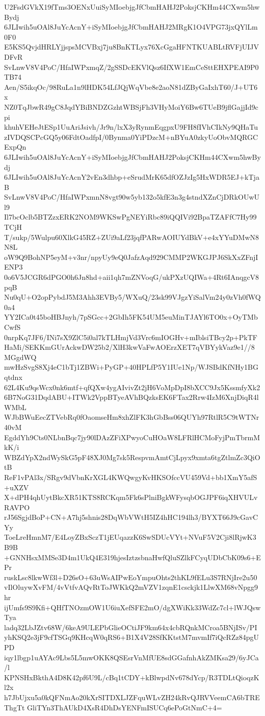 U2FsdGVkX19fTms3OENxUuiSyMIoebjgJfCbmHAHJ2PoksjCKHm44CXwm5hwBydj
6JLIwih5uOAl8JuYcAcnY+iSyMIoebjgJfCbmHAHJ2MRgK1O4VPG73jxQYlLm0F0
E5KS5QvjdHRLYjjspsMCVBxj7ju8BnKTLyx76XcGgaHFNTKUABLtRVFjUIJVDFvR
SvLnwV8V4PoC/HfaIWPxmqZ/2gSSDcEKVlQsz6IfXW1EmCeSttEHXPEAI9P0TB74
Aen/S5ikqOc/98RuLa1n9lHDK54LfJQjWqVbe8e2aoN81dZByGaIxhT60/J+UT6x
NZ0TqJbwR49gC8JqdYBiBNDZGzhtWBSjFh3VHyMoiY6Bw6TUeB9jflGajjId9cpi
khuhVEHeJtESp1UuAriJsivh/Jr9n/lxX3yRynmEqgpxU9FH8fIVhCIkNy9QHaTu
zIVDQSCPcGQ5y06FdtOadfpI/0Bynma0YiPDzcM+nBYuA0zkyUoObvMQRGCExpQn
6JLIwih5uOAl8JuYcAcnY+iSyMIoebjgJfCbmHAHJ2PoksjCKHm44CXwm5hwBydj
6JLIwih5uOAl8JuYcAcnY2vEn3dhbp+eSrudMrK65dfOZJzIg5HxWDR5EJ+kTjaB
SvLnwV8V4PoC/HfaIWPxmnN8vgt90w5yb132o5kfE3n3g4stndXZnCjDRkOUwUl9
Il7bcOclb5BTZzxERK2NOM9WKSwPgNEYiRbc89iQQIVi92BpaTZAFfC7Hy99TCjH
T/sukp/5Wulpu60XlkG45RZ+ZUi9aLf23jqfPARwAOIUYdBkV+e4xYYuDMwN8N8L
oW9Q9BohNP5eyM+v3nr/npyUy9eQ0JafzAqd929CMMP2WKGJPJ6SkXxZFnjIENP3
0o6V5JCGR6dPGO0h6Jn8hd+aii1qh7mZNVoqG/ukPXzUQIWa+4Rt6IAnqgcV8pqB
Nu0qU+O2opPybdJ5M3Ahh3EVBy5/WXuQ/23sk99VJgzYiSalVm24y0zVh0fWQ0a4
YY2ICa0t45boHBJnyh/7pSGcc+2GbIh5FK54UM5euMinTJAYl6TO0x+OyTMbCwfS
0nrpKq7JF6/INi7sX9ZlC5i0al7kTLHmjVd3Vrc6mIOGHv+mIblsiTBcy2p+PkTF
HaMi/SEKKmGUrAckwDW25b2/XlH3kwVaFwAOErzXET7qVBYykVaz9e1//8MGgdWQ
mwHzSvgS8Xj4eC1bTj1ZBWi+PyGP+40HPLfP5Y1IUe1Np/WJSBdKfNHy1BGqtdnx
62L4Ku9qsWcx0nk6mtf+qfQXw4ygAIvivZt2jH6VoMpDpI8bXCC9Jx5KssmfyXk2
6B7NoG31DqdABU+ITWk2VppBTyeAVhBQzksEK6FTax2Rrw4IzM6XnjDiqR4lWMbL
WJbBWuEecZTVebRq0fOaomseHm8xhZlFK3hGbBss06QUYh97RtlR5C9tWTNr40vM
EgddYh9Cts0NLbnBqc7jy90lDAzZFiXPwyoCuHOaW8LFRlHCMoFyjPmTbrmMkK/i
WBZdYpX2ndWySkG5pF48XJ0Mg7sk5RespvmAmtCjLpyx9xmta6tgZtlmZc3QiOtB
ReF1vPAl3x/SRgv9dVbnKrXGL4KWQwgyKvHKSOfccVU459Vd+bb1XmY5afS+uXZV
X+dPH4qhUytBkcXR51KTS8RCKqm5Fk6sPlniBgkWFysqbOGJPF6iqXHVULvRAVPO
rJ56SgjdBoP+CN+A7hj5shnis28DqWbVWtH5IZ4hHC194lh3/BYXT66J9cGavCYy
ToeLreHmnM7/E4LoyZBxSczT1jEUqazzK6SwSDUcVYt+NVuF5V2Cji8lRjwK3B9B
+GNNHsxMMSe3D4m1UkQ4E319hjesIztzsbnaHwfQluSZlkFCyqUDbCbK09s6+EPr
ruskLsc8lkwWf3l+D26sO+63uWsAIPwEoYmpuOhts2thKL9fELu3S7RNjIre2u50
vIlOluywXvFM/4vVtfvAQvRtToJWKkQ2mVZV1zqnE1csckjk1LlwXM68vNpgg9hr
ijUmfs9S9Kfi+QHfTNOzmOW1U6iuXefSFE2mO/dgXWiKk33WdZc7cl+lWJQswTya
ladq32LbJZtv68W/6keA9ULEPbGlieOCtiJF9km64x4cbRQnkMCroa5BNjISv/PI
yhKSQ2e3jF9cfTSGq9KHcqW0qRS6+B1X4V28SfKKtstM7mvmIf7iQcRZz84pgUPD
iqy1lbgp1uAYAc9Lbs5L5mwOKK8QSEsrVnMfUE8sdGGafnhAkZMKsa29/6yJCa/l
KPNSHxBkthA4D8K42pf6U9L/cBq1tCDY+kBlwpdNv678dYcp/R3TDLtQioqzKl2x
h7JbUjxu5a0kQFNmAo20kXrSITDXLJZFquWLvZH24kRvQJRVVeemCA6bTREThgTt
GliTYn3ThAUkD4XsR4DhDsYENFmISUCq6ePoGtNmC+4=
